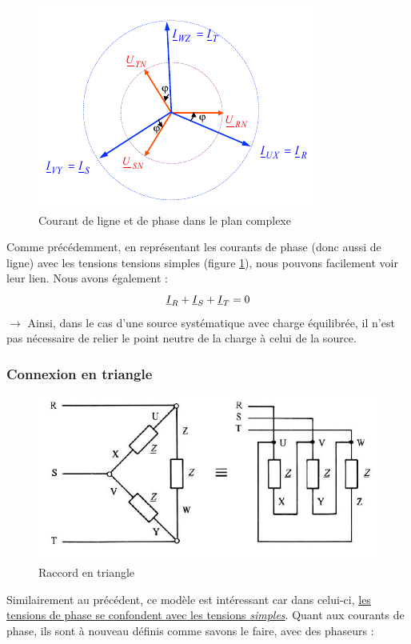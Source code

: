 \documentclass[12pt,a4paper]{article}
\newcommand{\ui}{\uline{I} }
\begin{document}
\begin{figure}
	\centering
	\includegraphics[scale=0.5]{images/phaseur_courant_triphase}
	\caption{Courant de ligne et de phase dans le plan complexe}
	\label{fig: phaseur courant ligne phase}
\end{figure}
Comme précédemment, en représentant les courants de phase (donc aussi de ligne) avec les tensions tensions simples (figure \ref{fig: phaseur courant ligne phase}), nous pouvons facilement voir leur lien. Nous avons également :
\[\ui_R + \ui_S + \ui_T = 0\]
$\to$ Ainsi, dans le cas d'une source systématique avec charge équilibrée, il n'est pas nécessaire de relier le point neutre de la charge à celui de la source.
\subsubsection{Connexion en triangle}
\begin{figure}
	\centering
	\includegraphics[scale=0.6]{images/charge_triphasee_triangle}
	\caption{Raccord en triangle}
	\label{fig: charge triphase triangle}
\end{figure}
Similairement au précédent, ce modèle est intéressant car dans celui-ci, \uline{les tensions de phase se confondent avec les tensions \textit{simples}}. Quant aux courants de phase, ils sont à nouveau définis comme savons le faire, avec des phaseurs :
\end{document}
